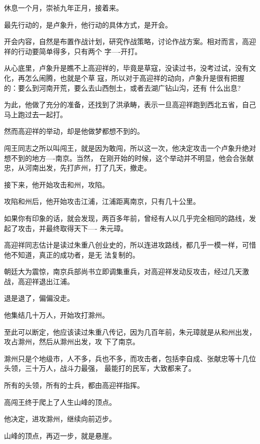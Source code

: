 \documentclass[11pt,a4paper,onecolumn]{article}
\begin{document}
休息一个月，崇祯九年正月，接着来。

最先行动的，是卢象升，他行动的具体方式，是开会。

开会内容，自然是布置作战计划，研究作战策略，讨论作战方案。相对而言，高迎祥的行动要简单得多，只有两个
字----开打。

从心底里，卢象升是瞧不上高迎祥的，毕竟是草寇，没读过书，没考过试，没有文化，再怎么闹腾，也就是个草
寇，所以对于高迎祥的动向，卢象升是很有把握的：要么到河南开荒，要么去山西刨土，或者去湖广钻山沟，还有
什么出息?

为此，他做了充分的准备，还找到了洪承畴，表示一旦高迎祥跑到西北五省，自己马上跑过去一起打。

然而高迎祥的举动，却是他做梦都想不到的。

闯王同志之所以叫闯王，就是因为敢闯，所以这一次，他决定攻击一个卢象升绝对想不到的地方----南京。当然，
在刚开始的时候，这个举动并不明显，他会合张献忠，从河南出发，先打庐州，打了几天，撤走。

接下来，他开始攻击和州，攻陷。

攻陷和州后，他开始攻击江浦，江浦距离南京，只有几十公里。

如果你有印象的话，就会发现，两百多年前，曾经有人以几乎完全相同的路线，发起了攻击，并最终取得天下----
朱元璋。

高迎祥同志估计是读过朱重八创业史的，所以连进攻路线，都几乎一模一样，可惜他不知道，真正的成功者，是无
法复制的。

朝廷大为震惊，南京兵部尚书立即调集重兵，对高迎祥发动反攻击，经过几天激战，高迎祥退出江浦。

退是退了，偏偏没走。

他集结几十万人，开始攻打滁州。

至此可以断定，他应该读过朱重八传记，因为几百年前，朱元璋就是从和州出发，攻占滁州，然后从滁州出发，攻
下了南京。

滁州只是个地级市，人不多，兵也不多，而攻击者，包括李自成、张献忠等十几位头领，三十万人，战斗力最强，
最能打的民军，大致都来了。

所有的头领，所有的士兵，都由高迎祥指挥。

高闯王终于爬上了人生山峰的顶点。

他决定，进攻滁州，继续向前迈步。

山峰的顶点，再迈一步，就是悬崖。

\section[\thesection]{}
\end{document}
